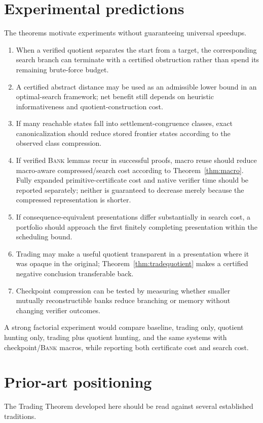 \documentclass[11pt]{article}
\theoremstyle{definition}
\theoremstyle{remark}
\newcommand{\BANK}{\textsc{Bank}}
\begin{document}
\section{Experimental predictions}
The theorems motivate experiments without guaranteeing universal speedups.

\begin{enumerate}
\item When a verified quotient separates the start from a target, the corresponding search branch can terminate with a certified obstruction rather than spend its remaining brute-force budget.
\item A certified abstract distance may be used as an admissible lower bound in an optimal-search framework; net benefit still depends on heuristic informativeness and quotient-construction cost.
\item If many reachable states fall into settlement-congruence classes, exact canonicalization should reduce stored frontier states according to the observed class compression.
\item If verified \BANK{} lemmas recur in successful proofs, macro reuse should reduce macro-aware compressed/search cost according to Theorem~\ref{thm:macro}. Fully expanded primitive-certificate cost and native verifier time should be reported separately; neither is guaranteed to decrease merely because the compressed representation is shorter.
\item If consequence-equivalent presentations differ substantially in search cost, a portfolio should approach the first finitely completing presentation within the scheduling bound.
\item Trading may make a useful quotient transparent in a presentation where it was opaque in the original; Theorem~\ref{thm:tradequotient} makes a certified negative conclusion transferable back.
\item Checkpoint compression can be tested by measuring whether smaller mutually reconstructible banks reduce branching or memory without changing verifier outcomes.
\end{enumerate}

A strong factorial experiment would compare baseline, trading only, quotient hunting only, trading plus quotient hunting, and the same systems with checkpoint/\BANK{} macros, while reporting both certificate cost and search cost.

\section{Prior-art positioning}
The Trading Theorem developed here should be read against several established traditions.
\end{document}
